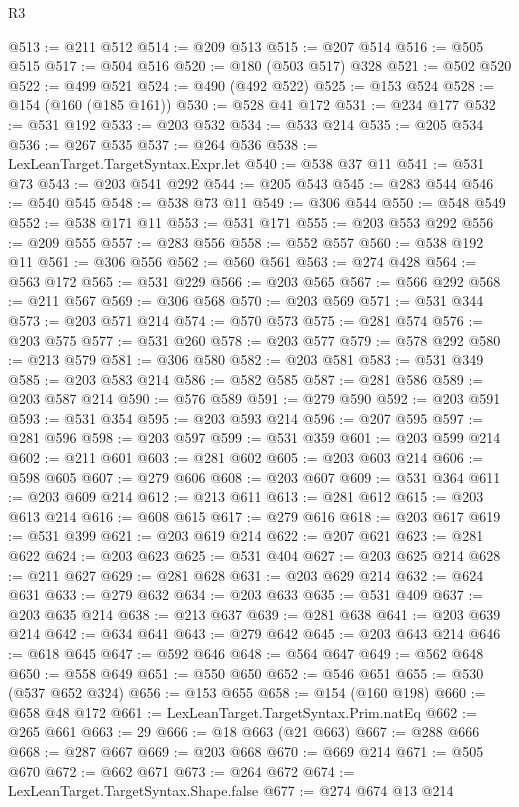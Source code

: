 \begin{lexlean}{R3}
\begin{coremodule}
@513 := @211 @512
@514 := @209 @513
@515 := @207 @514
@516 := @505 @515
@517 := @504 @516
@520 := @180 (@503 @517) @328
@521 := @502 @520
@522 := @499 @521
@524 := @490 (@492 @522)
@525 := @153 @524
@528 := @154 (@160 (@185 @161))
@530 := @528 @41 @172
@531 := @234 @177
@532 := @531 @192
@533 := @203 @532
@534 := @533 @214
@535 := @205 @534
@536 := @267 @535
@537 := @264 @536
@538 := LexLeanTarget.TargetSyntax.Expr.let
@540 := @538 @37 @11
@541 := @531 @73
@543 := @203 @541 @292
@544 := @205 @543
@545 := @283 @544
@546 := @540 @545
@548 := @538 @73 @11
@549 := @306 @544
@550 := @548 @549
@552 := @538 @171 @11
@553 := @531 @171
@555 := @203 @553 @292
@556 := @209 @555
@557 := @283 @556
@558 := @552 @557
@560 := @538 @192 @11
@561 := @306 @556
@562 := @560 @561
@563 := @274 @428
@564 := @563 @172
@565 := @531 @229
@566 := @203 @565
@567 := @566 @292
@568 := @211 @567
@569 := @306 @568
@570 := @203 @569
@571 := @531 @344
@573 := @203 @571 @214
@574 := @570 @573
@575 := @281 @574
@576 := @203 @575
@577 := @531 @260
@578 := @203 @577
@579 := @578 @292
@580 := @213 @579
@581 := @306 @580
@582 := @203 @581
@583 := @531 @349
@585 := @203 @583 @214
@586 := @582 @585
@587 := @281 @586
@589 := @203 @587 @214
@590 := @576 @589
@591 := @279 @590
@592 := @203 @591
@593 := @531 @354
@595 := @203 @593 @214
@596 := @207 @595
@597 := @281 @596
@598 := @203 @597
@599 := @531 @359
@601 := @203 @599 @214
@602 := @211 @601
@603 := @281 @602
@605 := @203 @603 @214
@606 := @598 @605
@607 := @279 @606
@608 := @203 @607
@609 := @531 @364
@611 := @203 @609 @214
@612 := @213 @611
@613 := @281 @612
@615 := @203 @613 @214
@616 := @608 @615
@617 := @279 @616
@618 := @203 @617
@619 := @531 @399
@621 := @203 @619 @214
@622 := @207 @621
@623 := @281 @622
@624 := @203 @623
@625 := @531 @404
@627 := @203 @625 @214
@628 := @211 @627
@629 := @281 @628
@631 := @203 @629 @214
@632 := @624 @631
@633 := @279 @632
@634 := @203 @633
@635 := @531 @409
@637 := @203 @635 @214
@638 := @213 @637
@639 := @281 @638
@641 := @203 @639 @214
@642 := @634 @641
@643 := @279 @642
@645 := @203 @643 @214
@646 := @618 @645
@647 := @592 @646
@648 := @564 @647
@649 := @562 @648
@650 := @558 @649
@651 := @550 @650
@652 := @546 @651
@655 := @530 (@537 @652 @324)
@656 := @153 @655
@658 := @154 (@160 @198)
@660 := @658 @48 @172
@661 := LexLeanTarget.TargetSyntax.Prim.natEq
@662 := @265 @661
@663 := 29
@666 := @18 @663 (@21 @663)
@667 := @288 @666
@668 := @287 @667
@669 := @203 @668
@670 := @669 @214
@671 := @505 @670
@672 := @662 @671
@673 := @264 @672
@674 := LexLeanTarget.TargetSyntax.Shape.false
@677 := @274 @674 @13 @214

\end{coremodule}
\end{lexlean}
